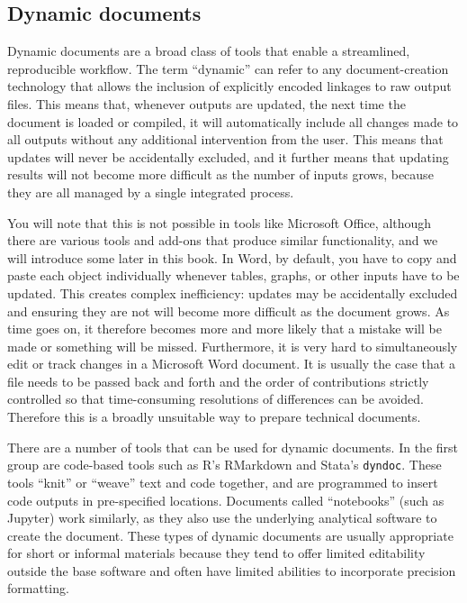 \subsection{Dynamic documents}

Dynamic documents are a broad class of tools that enable a streamlined, reproducible workflow.
The term ``dynamic'' can refer to any document-creation technology
that allows the inclusion of explicitly encoded linkages to raw output files.
This means that, whenever outputs are updated,
the next time the document is loaded or compiled, it will automatically include
all changes made to all outputs without any additional intervention from the user.
This means that updates will never be accidentally excluded,
and it further means that updating results will not become more difficult
as the number of inputs grows,
because they are all managed by a single integrated process.

You will note that this is not possible in tools like Microsoft Office,
although there are various tools and add-ons that produce similar functionality,
and we will introduce some later in this book.
In Word, by default, you have to copy and paste each object individually
whenever tables, graphs, or other inputs have to be updated.
This creates complex inefficiency: updates may be accidentally excluded
and ensuring they are not will become more difficult as the document grows.
As time goes on, it therefore becomes more and more likely
that a mistake will be made or something will be missed.
Furthermore, it is very hard to simultaneously edit or track changes
in a Microsoft Word document.
It is usually the case that a file needs to be passed back and forth
and the order of contributions strictly controlled
so that time-consuming resolutions of differences can be avoided.
Therefore this is a broadly unsuitable way to prepare technical documents.

There are a number of tools that can be used for dynamic documents.
In the first group are code-based tools such as R's RMarkdown
and Stata's \texttt{dyndoc}.
These tools ``knit'' or ``weave'' text and code together,
and are programmed to insert code outputs in pre-specified locations.
Documents called ``notebooks'' (such as Jupyter) work similarly,
as they also use the underlying analytical software to create the document.
These types of dynamic documents are usually appropriate for short or informal materials
because they tend to offer limited editability outside the base software
and often have limited abilities to incorporate precision formatting.

